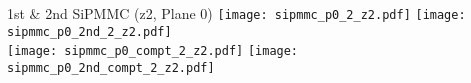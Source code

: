 \documentclass{beamer}
\begin{document}
%
%

\begin{frame}{1st \& 2nd SiPMMC (z2, Plane 0)}
	\texttt{[image: sipmmc\_p0\_2\_z2.pdf]}
	\texttt{[image: sipmmc\_p0\_2nd\_2\_z2.pdf]} \\
	
		\texttt{[image: sipmmc\_p0\_compt\_2\_z2.pdf]}
		\texttt{[image: sipmmc\_p0\_2nd\_compt\_2\_z2.pdf]}
\end{frame}
\end{document}
